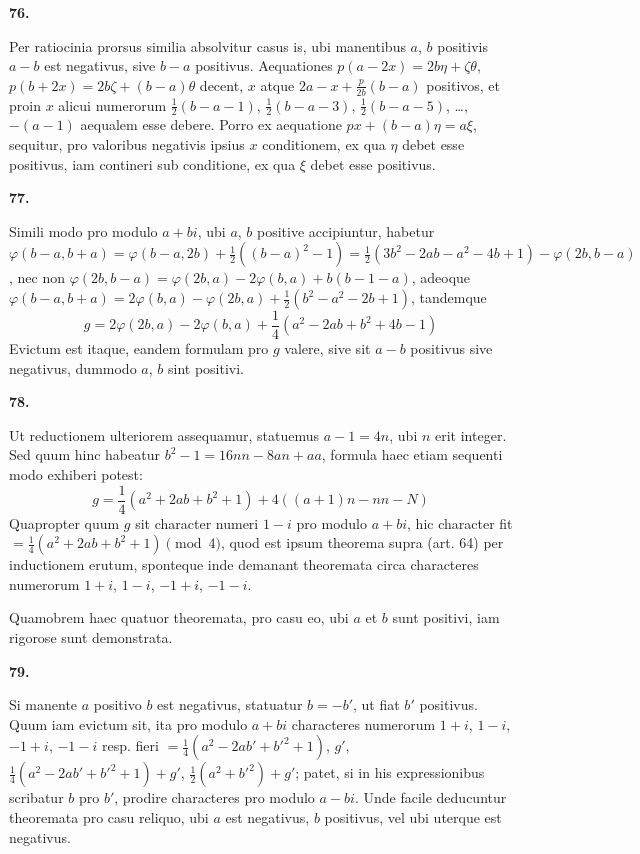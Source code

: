 \documentclass[12pt,a4paper]{article}
\theoremstyle{plain}
\theoremstyle{definition}
\theoremstyle{remark}
\begin{document}
\bigskip

\noindent\textbf{76.}

Per ratiocinia prorsus similia absolvitur casus is, ubi manentibus $a$, $b$ positivis $a-b$ est negativus, sive $b-a$ positivus. Aequationes $p(a-2x) = 2b\eta + \zeta\theta$, $p(b+2x) = 2b\zeta + (b-a)\theta$ decent, $x$ atque $2a - x + \frac{p}{2b}(b-a)$ positivos, et proin $x$ alicui numerorum $\frac{1}{2}(b-a-1)$, $\frac{1}{2}(b-a-3)$, $\frac{1}{2}(b-a-5)$, \ldots, $-(a-1)$ aequalem esse debere. Porro ex aequatione $px + (b-a)\eta = a\xi$, sequitur, pro valoribus negativis ipsius $x$ conditionem, ex qua $\eta$ debet esse positivus, iam contineri sub conditione, ex qua $\xi$ debet esse positivus.

\bigskip

\noindent\textbf{77.}

Simili modo pro modulo $a+bi$, ubi $a$, $b$ positive accipiuntur, habetur $\varphi(b-a, b+a) = \varphi(b-a, 2b) + \frac{1}{2}((b-a)^2 - 1) = \frac{1}{2}(3b^2 - 2ab - a^2 - 4b + 1) - \varphi(2b, b-a)$, nec non $\varphi(2b, b-a) = \varphi(2b, a) - 2\varphi(b, a) + b(b-1-a)$, adeoque $\varphi(b-a, b+a) = 2\varphi(b, a) - \varphi(2b, a) + \frac{1}{2}(b^2 - a^2 - 2b + 1)$, tandemque
\[
g = 2\varphi(2b, a) - 2\varphi(b, a) + \frac{1}{4}(a^2 - 2ab + b^2 + 4b - 1)
\]
Evictum est itaque, eandem formulam pro $g$ valere, sive sit $a-b$ positivus sive negativus, dummodo $a$, $b$ sint positivi.

\bigskip

\noindent\textbf{78.}

Ut reductionem ulteriorem assequamur, statuemus $a - 1 = 4n$, ubi $n$ erit integer. Sed quum hinc habeatur $b^2 - 1 = 16nn - 8an + aa$, formula haec etiam sequenti modo exhiberi potest:
\[
g = \frac{1}{4}(a^2 + 2ab + b^2 + 1) + 4((a+1)n - nn - N)
\]
Quapropter quum $g$ sit character numeri $1-i$ pro modulo $a+bi$, hic character fit $= \frac{1}{4}(a^2 + 2ab + b^2 + 1) \pmod{4}$, quod est ipsum theorema supra (art. 64) per inductionem erutum, sponteque inde demanant theoremata circa characteres numerorum $1+i$, $1-i$, $-1+i$, $-1-i$.

Quamobrem haec quatuor theoremata, pro casu eo, ubi $a$ et $b$ sunt positivi, iam rigorose sunt demonstrata.

\bigskip

\noindent\textbf{79.}

Si manente $a$ positivo $b$ est negativus, statuatur $b = -b'$, ut fiat $b'$ positivus. Quum iam evictum sit, ita pro modulo $a+bi$ characteres numerorum $1+i$, $1-i$, $-1+i$, $-1-i$ resp. fieri $= \frac{1}{4}(a^2 - 2ab' + b'^2 + 1)$, $g'$, $\frac{1}{4}(a^2 - 2ab' + b'^2 + 1) + g'$, $\frac{1}{2}(a^2 + b'^2) + g'$; patet, si in his expressionibus scribatur $b$ pro $b'$, prodire characteres pro modulo $a-bi$. Unde facile deducuntur theoremata pro casu reliquo, ubi $a$ est negativus, $b$ positivus, vel ubi uterque est negativus.
\end{document}
